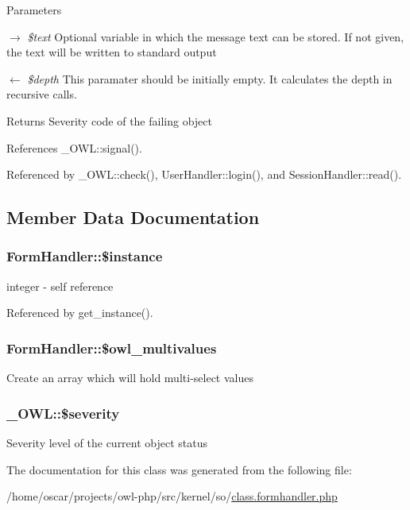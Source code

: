 \begin{DoxyParams}{Parameters}
\item[\mbox{$\rightarrow$} {\em \$text}]Optional variable in which the message text can be stored. If not given, the text will be written to standard output \item[\mbox{$\leftarrow$} {\em \$depth}]This paramater should be initially empty. It calculates the depth in recursive calls. \end{DoxyParams}
\begin{DoxyReturn}{Returns}
Severity code of the failing object 
\end{DoxyReturn}


References \_\-OWL::signal().



Referenced by \_\-OWL::check(), UserHandler::login(), and SessionHandler::read().



\subsection{Member Data Documentation}
\subsubsection[{\$instance}]{\setlength{\rightskip}{0pt plus 5cm}FormHandler::\$instance}\label{classFormHandler_a54efe3849e4065053f0eb0313356d072}
integer -\/ self reference 

Referenced by get\_\-instance().

\subsubsection[{\$owl\_\-multivalues}]{\setlength{\rightskip}{0pt plus 5cm}FormHandler::\$owl\_\-multivalues}\label{classFormHandler_a7aa914557e2c76b46e4e0601c5dd75d5}
Create an array which will hold multi-\/select values 
\subsubsection[{\$severity}]{\setlength{\rightskip}{0pt plus 5cm}\_\-OWL::\$severity}\label{class__OWL_ad26b40a9dbbacb33e299b17826f8327c}
Severity level of the current object status 

The documentation for this class was generated from the following file:\begin{DoxyCompactItemize}
\item 
/home/oscar/projects/owl-\/php/src/kernel/so/\hyperlink{class_8formhandler_8php}{class.formhandler.php}\end{DoxyCompactItemize}
